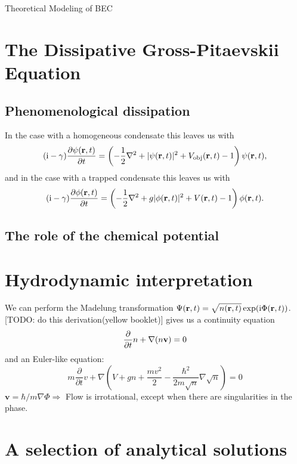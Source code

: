 \begin{chapter}{\label{cha:theoretical_model}Theoretical Modeling of BEC}
\section{\label{section:gpe} The Dissipative Gross-Pitaevskii Equation}
	\subsection{\label{section:gamma} Phenomenological dissipation}
	In the case with a homogeneous condensate this leaves us with
		\begin{equation}\label{eq:dissgpehomg}
		(\mathrm{i} - \gamma)\frac{\partial\psi({\bf r},t)}{\partial t} = \left( -\frac{1}{2}\nabla^2 + |\psi({\bf r},t)|^2 + V_{\mathrm{obj}}({\bf r},t) - 1 \right) \psi({\bf r},t),
		\end{equation}
	and in the case with a trapped condensate this leaves us with
		\begin{equation}\label{eq:dissgpetrapped}
		(\mathrm{i}-\gamma)\frac{\partial\phi({\bf r},t)}{\partial t} = \left( -\frac{1}{2}\nabla^2 + g|\phi({\bf r},t)|^2 + V({\bf r},t) - 1 \right) \phi({\bf r},t).
		\end{equation}

	\subsection{\label{section:mu} The role of the chemical potential}
\section{\label{section:hydrodynamic} Hydrodynamic interpretation}
	We can perform the Madelung transformation $\Psi({\bf r},t) = \sqrt{n({\bf r},t)}\exp (\mathrm{i}\Phi({\bf r},t))$.
	[TODO: do this derivation(yellow booklet)]
	gives us a continuity equation
	\begin{equation}
		\frac{\partial}{\partial t} n + \nabla(n{\bf v}) = 0
		\label{eq:MTcont}
	\end{equation}
	and an Euler-like equation:
	\begin{equation}
		m\frac{\partial}{\partial t} v + \nabla\left(V + gn + \frac{mv^2}{2} - \frac{\hbar^2}{2m\sqrt{n}}\nabla\sqrt{n}\right) = 0
		\label{eq:MTeuler}
	\end{equation}
	$\mathbf{v} = \hbar/m\nabla\Phi \Rightarrow$ Flow is irrotational, except when there are singularities in the phase. 
\section{\label{section:solutions} A selection of analytical solutions}

\end{chapter}

